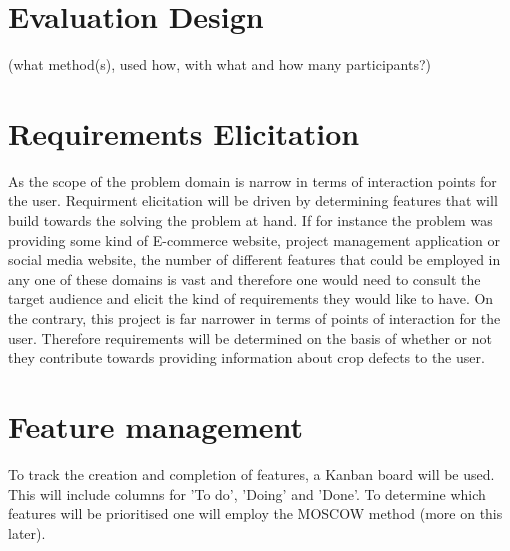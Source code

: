 \section{Evaluation Design}
 (what method(s), used how, with what and how many participants?)

\section{Requirements Elicitation}
  As the scope of the problem domain is narrow in terms of interaction points for the user. Requirment elicitation will be driven by determining features that will build towards the solving the problem at hand. If for instance the problem was providing some kind of E-commerce website, project management application or social media website, the number of different features that could be employed in any one of these domains is vast and therefore one would need to consult the target audience and elicit the kind of requirements they would like to have. On the contrary, this project is far narrower in terms of points of interaction for the user. Therefore requirements will be determined on the basis of whether or not they contribute towards providing information about crop defects to the user.

\section{Feature management}
  To track the creation and completion of features, a Kanban board will be used. This will include columns for 'To do', 'Doing' and 'Done'.
  To determine which features will be prioritised one will employ the MOSCOW method (more on this later).

